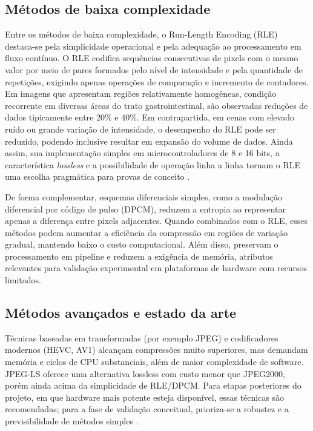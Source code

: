 \documentclass[repeatfields,xlists,xpacks,oneside]{ufrgscca}
\begin{document}
\subsection{Métodos de baixa complexidade}

Entre os métodos de baixa complexidade, o Run-Length Encoding (RLE) destaca-se pela simplicidade operacional e pela adequação ao processamento em fluxo contínuo. O RLE codifica sequências consecutivas de pixels com o mesmo valor por meio de pares formados pelo nível de intensidade e pela quantidade de repetições, exigindo apenas operações de comparação e incremento de contadores. Em imagens que apresentam regiões relativamente homogêneas, condição recorrente em diversas áreas do trato gastrointestinal, são observadas reduções de dados tipicamente entre 20\% e 40\%. Em contrapartida, em cenas com elevado ruído ou grande variação de intensidade, o desempenho do RLE pode ser reduzido, podendo inclusive resultar em expansão do volume de dados. Ainda assim, sua implementação simples em microcontroladores de 8 e 16 bits, a característica \textit{lossless} e a possibilidade de operação linha a linha tornam o RLE uma escolha pragmática para provas de conceito \cite{kim2021capsule}.

De forma complementar, esquemas diferenciais simples, como a modulação diferencial por código de pulso (DPCM), reduzem a entropia ao representar apenas a diferença entre pixels adjacentes. Quando combinados com o RLE, esses métodos podem aumentar a eficiência da compressão em regiões de variação gradual, mantendo baixo o custo computacional. Além disso, preservam o processamento em pipeline e reduzem a exigência de memória, atributos relevantes para validação experimental em plataformas de hardware com recursos limitados.

\subsection{Métodos avançados e estado da arte}

Técnicas baseadas em transformadas (por exemplo JPEG) e codificadores modernos (HEVC, AV1) alcançam compressões muito superiores, mas demandam memória e ciclos de CPU substanciais, além de maior complexidade de software. JPEG-LS oferece uma alternativa lossless com custo menor que JPEG2000, porém ainda acima da simplicidade de RLE/DPCM. Para etapas posteriores do projeto, em que hardware mais potente esteja disponível, essas técnicas são recomendadas; para a fase de validação conceitual, prioriza-se a robustez e a previsibilidade de métodos simples  \textcite{cavallotti2011fpga}. %
\end{document}
